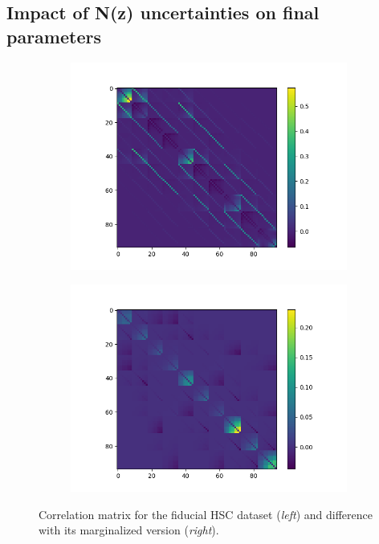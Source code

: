 \documentclass[a4paper,11pt]{article}
\begin{document}
\subsection{Impact of N(z) uncertainties on final parameters}


\begin{figure}[ht]
\centering
\begin{subfigure}{.5\textwidth}
  \centering
  \includegraphics[width=1.\linewidth]{./corr_data.png}
  \label{fig:sub1}
\end{subfigure}%
\begin{subfigure}{.5\textwidth}
  \centering
  \includegraphics[width=1.\linewidth]{./corr_diff.png}
  \label{fig:sub2}
\end{subfigure}
\caption{Correlation matrix for the fiducial HSC dataset (\textit{left}) and difference with its marginalized version (\textit{right}).}
\label{fig:fid_marg_cov}
\end{figure}
\end{document}
